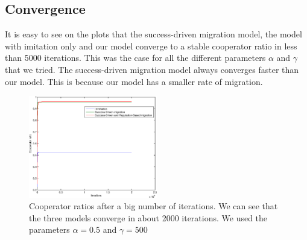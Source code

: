 \documentclass[11pt]{article}
\begin{document}
\subsection{Convergence}
It is easy to see on the plots that the success-driven migration model, the model with imitation only and our model converge to a stable cooperator ratio in less than 5000 iterations. This was the case for all the different parameters $\alpha$ and $\gamma$ that we tried.
The success-driven migration model always converges faster than our model. This is because our model has a smaller rate of migration.
\begin{figure}[!h]
	\centering
        \includegraphics[width=0.5\textwidth]{../../other/plots/convergence-20000.eps}
	\caption{Cooperator ratios after a big number of iterations. We can see that the three models converge in about 2000 iterations. We used the parameters $\alpha = 0.5$ and $\gamma = 500$}
\end{figure}
\end{document}
